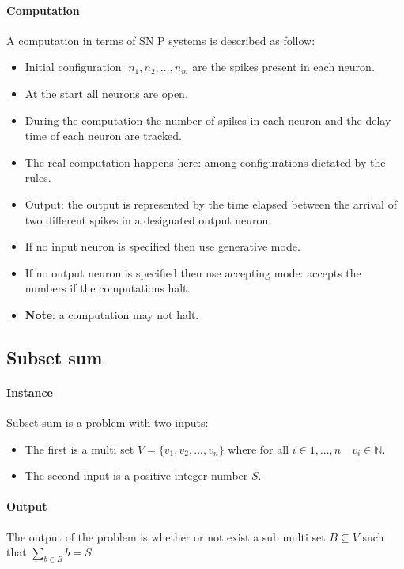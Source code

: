 \documentclass[12pt,a4paper]{report}
\begin{document}
\paragraph{Computation}
A computation in terms of SN P systems is described as follow:
\begin{itemize}
\item Initial configuration: $n_{1}, n_{2}, ..., n_{m}$ are the spikes present in each neuron.
\item At the start all neurons are open.
\item During the computation the number of spikes in each neuron and the delay time of each neuron are tracked.
\item The real computation happens here: among configurations dictated by the rules.
\item Output: the output is represented by the time elapsed between the arrival of two different spikes in a designated output neuron.
\item If no input neuron is specified then use generative mode.
\item If no output neuron is specified then use accepting mode: accepts the numbers if the computations halt.
\item \textbf{Note}: a computation may not halt. 
\end{itemize}


\subsection{Subset sum}
\label{subset sum solution}
\paragraph{Instance}
Subset sum is a problem with two inputs:
\begin{itemize}
\item The first is a multi set $ V = \lbrace v_{1}, v_{2}, ..., v_{n} \rbrace $ where for all $i \in 1,...,n \quad v_{i} \in \mathbb{N}$.
\item The second input is a positive integer number $S$.
\end{itemize}
\paragraph{Output}
The output of the problem is whether or not exist a sub multi set $B \subseteq V$ such that $\displaystyle\sum_{b \in B} b = S$
\end{document}
